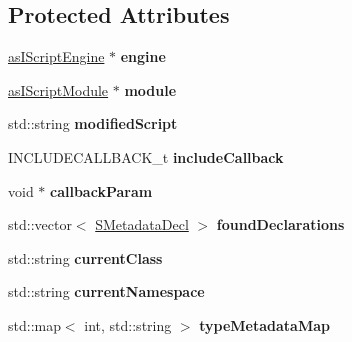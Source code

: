 \subsection*{Protected Attributes}
\begin{DoxyCompactItemize}
\item 
\mbox{\label{class_c_script_builder_a9f2c02d7ac5c8bec9d0687ce09003174}} 
\hyperlink{classas_i_script_engine}{as\+I\+Script\+Engine} $\ast$ {\bfseries engine}
\item 
\mbox{\label{class_c_script_builder_a61f9d260f89ea0c64f3c96980d55f0b9}} 
\hyperlink{classas_i_script_module}{as\+I\+Script\+Module} $\ast$ {\bfseries module}
\item 
\mbox{\label{class_c_script_builder_adc1419aac7f291609cfaabbe02839402}} 
std\+::string {\bfseries modified\+Script}
\item 
\mbox{\label{class_c_script_builder_adb389ba420f1de62fea2aa2816e91344}} 
I\+N\+C\+L\+U\+D\+E\+C\+A\+L\+L\+B\+A\+C\+K\+\_\+t {\bfseries include\+Callback}
\item 
\mbox{\label{class_c_script_builder_a02f2414a8abe1819c559bdbc09b28155}} 
void $\ast$ {\bfseries callback\+Param}
\item 
\mbox{\label{class_c_script_builder_ad2d5f49aeb1760e90757482d68aa7199}} 
std\+::vector$<$ \hyperlink{struct_c_script_builder_1_1_s_metadata_decl}{S\+Metadata\+Decl} $>$ {\bfseries found\+Declarations}
\item 
\mbox{\label{class_c_script_builder_adc829390e3b09f726ca0639d4033848b}} 
std\+::string {\bfseries current\+Class}
\item 
\mbox{\label{class_c_script_builder_a8f16fb8258f3186117ea3766de3c65b5}} 
std\+::string {\bfseries current\+Namespace}
\item 
\mbox{\label{class_c_script_builder_a296b3b54550c19f2c73911231eafa097}} 
std\+::map$<$ int, std\+::string $>$ {\bfseries type\+Metadata\+Map}
\item 

\end{DoxyCompactItemize}
